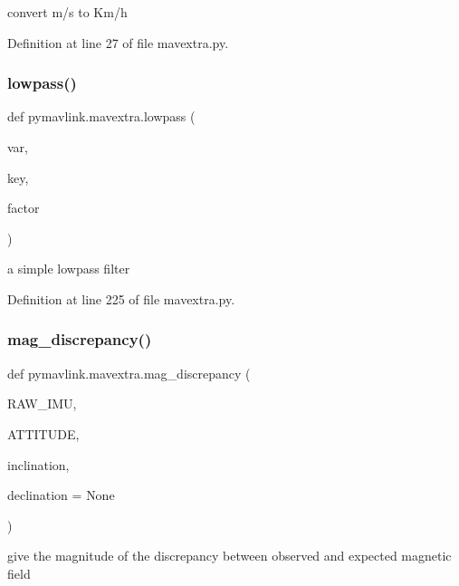 \begin{DoxyVerb}convert m/s to Km/h\end{DoxyVerb}
 

Definition at line 27 of file mavextra.\+py.

\mbox{\label{namespacepymavlink_1_1mavextra_ae160af64a51d6e6c620fc12450857585}} 
\subsubsection{\texorpdfstring{lowpass()}{lowpass()}}
{\footnotesize\ttfamily def pymavlink.\+mavextra.\+lowpass (\begin{DoxyParamCaption}\item[{}]{var,  }\item[{}]{key,  }\item[{}]{factor }\end{DoxyParamCaption})}

\begin{DoxyVerb}a simple lowpass filter\end{DoxyVerb}
 

Definition at line 225 of file mavextra.\+py.

\mbox{\label{namespacepymavlink_1_1mavextra_aaae8d1963031a79098cf818d480e0756}} 
\subsubsection{\texorpdfstring{mag\_discrepancy()}{mag\_discrepancy()}}
{\footnotesize\ttfamily def pymavlink.\+mavextra.\+mag\+\_\+discrepancy (\begin{DoxyParamCaption}\item[{}]{R\+A\+W\+\_\+\+I\+MU,  }\item[{}]{A\+T\+T\+I\+T\+U\+DE,  }\item[{}]{inclination,  }\item[{}]{declination = {\ttfamily None} }\end{DoxyParamCaption})}

\begin{DoxyVerb}give the magnitude of the discrepancy between observed and expected magnetic field\end{DoxyVerb}
 

